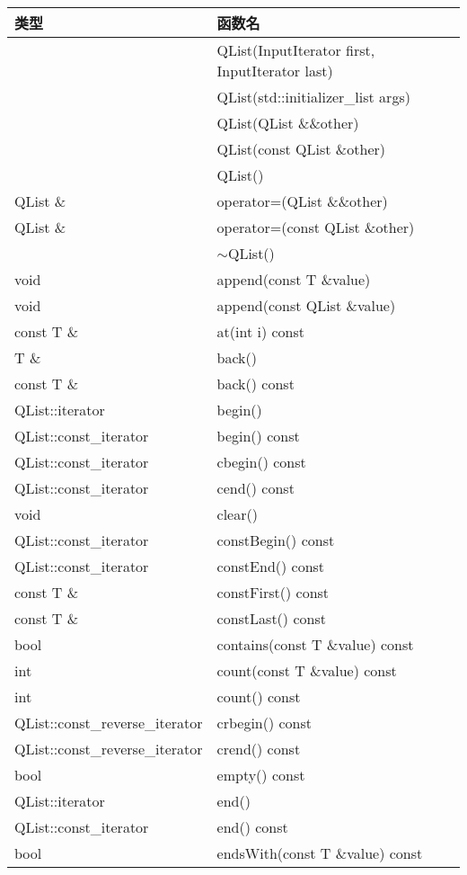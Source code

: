 \begin{longtable}[l]{|l|m{25em}|}
\hline
 类型& 	函数名\\
\hline
 &	QList(InputIterator first, InputIterator last)\\
\hline
&	QList(std::initializer\_list args)\\
\hline
&	QList(QList \&\&other)\\
\hline
&	QList(const QList \&other)\\
\hline
&	QList()\\
\hline
QList \&& 	operator=(QList \&\&other)\\
\hline
QList \& &	operator=(const QList \&other)\\
\hline
	& $\sim$QList()\\
\hline
void &	append(const T \&value)\\
\hline
void &	append(const QList \&value)\\
\hline
const T \& & 	at(int i) const\\
\hline
T \& &	back()\\
\hline
const T \& &	back() const\\
\hline
QList::iterator &	begin()\\
\hline
QList::const\_iterator& 	begin() const\\
\hline
QList::const\_iterator& 	cbegin() const\\
\hline
QList::const\_iterator& 	cend() const\\
\hline
void &	clear()\\
\hline
QList::const\_iterator & 	constBegin() const\\
\hline
QList::const\_iterator &	constEnd() const\\
\hline
const T \& &	constFirst() const\\
\hline
const T \& &	constLast() const\\
\hline
bool& 	contains(const T \&value) const\\
\hline
int& 	count(const T \&value) const\\
\hline
int& 	count() const\\
\hline
QList::const\_reverse\_iterator &	crbegin() const\\
\hline
QList::const\_reverse\_iterator &	crend() const\\
\hline
bool 	& empty() const\\
\hline
QList::iterator& 	end()\\
\hline
QList::const\_iterator &	end() const\\
\hline
bool &	endsWith(const T \&value) const\\

\end{longtable}
